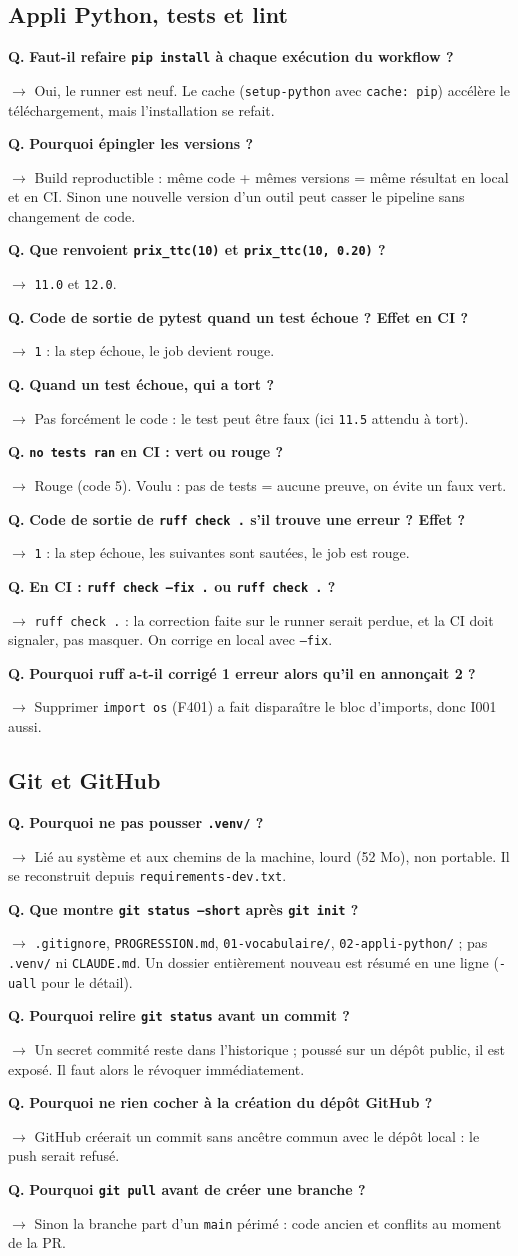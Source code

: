 \documentclass[11pt,a4paper]{article}
\newcommand{\qr}[2]{\par\needspace{4\baselineskip}\noindent\textbf{\textcolor{bleu}{Q.}} \textbf{#1}\par
  \noindent\hspace*{1em}\parbox{\dimexpr\linewidth-1em}{\textcolor{vert}{$\rightarrow$} #2}\par\medskip}
\newcommand{\cmd}[1]{\texttt{#1}}
\begin{document}
\subsection{Appli Python, tests et lint}
\qr{Faut-il refaire \cmd{pip install} à chaque exécution du workflow ?}{Oui, le runner est neuf. Le cache (\cmd{setup-python} avec \cmd{cache: pip}) accélère le téléchargement, mais l'installation se refait.}
\qr{Pourquoi épingler les versions ?}{Build reproductible : même code + mêmes versions = même résultat en local et en CI. Sinon une nouvelle version d'un outil peut casser le pipeline sans changement de code.}
\qr{Que renvoient \cmd{prix\_ttc(10)} et \cmd{prix\_ttc(10, 0.20)} ?}{\cmd{11.0} et \cmd{12.0}.}
\qr{Code de sortie de pytest quand un test échoue ? Effet en CI ?}{\cmd{1} : la step échoue, le job devient rouge.}
\qr{Quand un test échoue, qui a tort ?}{Pas forcément le code : le test peut être faux (ici \cmd{11.5} attendu à tort).}
\qr{\cmd{no tests ran} en CI : vert ou rouge ?}{Rouge (code 5). Voulu : pas de tests = aucune preuve, on évite un faux vert.}
\qr{Code de sortie de \cmd{ruff check .} s'il trouve une erreur ? Effet ?}{\cmd{1} : la step échoue, les suivantes sont sautées, le job est rouge.}
\qr{En CI : \cmd{ruff check --fix .} ou \cmd{ruff check .} ?}{\cmd{ruff check .} : la correction faite sur le runner serait perdue, et la CI doit signaler, pas masquer. On corrige en local avec \cmd{--fix}.}
\qr{Pourquoi ruff a-t-il corrigé 1 erreur alors qu'il en annonçait 2 ?}{Supprimer \cmd{import os} (F401) a fait disparaître le bloc d'imports, donc I001 aussi.}

\subsection{Git et GitHub}
\qr{Pourquoi ne pas pousser \cmd{.venv/} ?}{Lié au système et aux chemins de la machine, lourd (52 Mo), non portable. Il se reconstruit depuis \cmd{requirements-dev.txt}.}
\qr{Que montre \cmd{git status --short} après \cmd{git init} ?}{\cmd{.gitignore}, \cmd{PROGRESSION.md}, \cmd{01-vocabulaire/}, \cmd{02-appli-python/} ; pas \cmd{.venv/} ni \cmd{CLAUDE.md}. Un dossier entièrement nouveau est résumé en une ligne (\cmd{-uall} pour le détail).}
\qr{Pourquoi relire \cmd{git status} avant un commit ?}{Un secret commité reste dans l'historique ; poussé sur un dépôt public, il est exposé. Il faut alors le révoquer immédiatement.}
\qr{Pourquoi ne rien cocher à la création du dépôt GitHub ?}{GitHub créerait un commit sans ancêtre commun avec le dépôt local : le push serait refusé.}
\qr{Pourquoi \cmd{git pull} avant de créer une branche ?}{Sinon la branche part d'un \cmd{main} périmé : code ancien et conflits au moment de la PR.}
\end{document}
